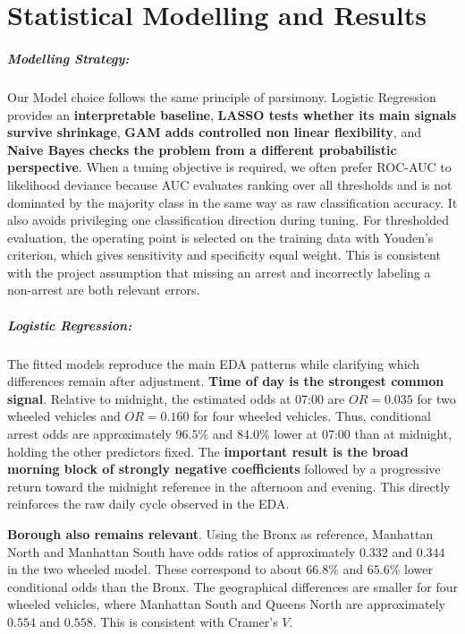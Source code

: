 \chapter{Statistical Modelling and Results}

\paragraph{Modelling Strategy:} Our Model choice follows the same principle of parsimony. Logistic Regression provides an \textbf{interpretable baseline}, \textbf{LASSO tests whether its main signals survive shrinkage}, \textbf{GAM adds controlled non linear flexibility}, and \textbf{Naive Bayes checks the problem from a different probabilistic perspective}. When a tuning objective is required, we often prefer ROC-AUC to likelihood deviance because AUC evaluates ranking over all thresholds and is not dominated by the majority class in the same way as raw classification accuracy. It also avoids privileging one classification direction during tuning. For thresholded evaluation, the operating point is selected on the training data with Youden's criterion, which gives sensitivity and specificity equal weight. This is consistent with the project assumption that missing an arrest and incorrectly labeling a non-arrest are both relevant errors.

\paragraph{Logistic Regression:} The fitted models reproduce the main EDA patterns while clarifying which differences remain after adjustment. \textbf{Time of day is the strongest common signal}. Relative to midnight, the estimated odds at 07:00 are $OR=0.035$ for two wheeled vehicles and $OR=0.160$ for four wheeled vehicles. Thus, conditional arrest odds are approximately $96.5\%$ and $84.0\%$ lower at 07:00 than at midnight, holding the other predictors fixed. The \textbf{important result is the broad morning block of strongly negative coefficients} followed by a progressive return toward the midnight reference in the afternoon and evening. This directly reinforces the raw daily cycle observed in the EDA.

\textbf{Borough also remains relevant}. Using the Bronx as reference, Manhattan North and Manhattan South have odds ratios of approximately $0.332$ and $0.344$ in the two wheeled model. These correspond to about $66.8\%$ and $65.6\%$ lower conditional odds than the Bronx. The geographical differences are smaller for four wheeled vehicles, where Manhattan South and Queens North are approximately $0.554$ and $0.558$. This is consistent with Cramer's $V$.

